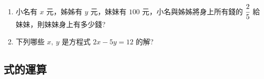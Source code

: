 \documentclass[bwprint,a4paper]{extarticle}
\begin{document}
\vspace{15ex}
\begin{observing}
	\begin{enumerate}
		\item 小名有 $x$ 元，姊姊有 $y$ 元，妹妹有 $100$ 元，小名與姊姊將身上所有錢的 $\cfrac25$ 給妹妹，則妹妹身上有多少錢?\\
		\item 下列哪些 $x,\ y$ 是方程式 $2x-5y=12$ 的解?\\[12pt]
	\end{enumerate}
\end{observing}
\vspace{15ex}
\subsection{式的運算}
\end{document}
